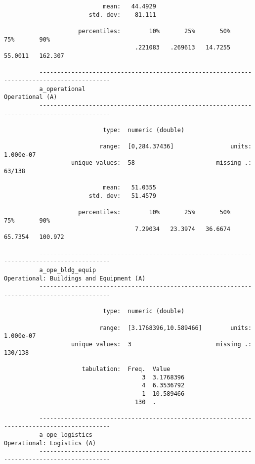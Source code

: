 \documentclass{article}
\begin{document}
\begin{verbatim}
                            mean:   44.4929
                        std. dev:    81.111
          
                     percentiles:        10%       25%       50%       75%       90%
                                     .221083   .269613   14.7255   55.0011   162.307
          
          ------------------------------------------------------------------------------------------
          a_operational                                                              Operational (A)
          ------------------------------------------------------------------------------------------
          
                            type:  numeric (double)
          
                           range:  [0,284.37436]                units:  1.000e-07
                   unique values:  58                       missing .:  63/138
          
                            mean:   51.0355
                        std. dev:   51.4579
          
                     percentiles:        10%       25%       50%       75%       90%
                                     7.29034   23.3974   36.6674   65.7354   100.972
          
          ------------------------------------------------------------------------------------------
          a_ope_bldg_equip                                  Operational: Buildings and Equipment (A)
          ------------------------------------------------------------------------------------------
          
                            type:  numeric (double)
          
                           range:  [3.1768396,10.589466]        units:  1.000e-07
                   unique values:  3                        missing .:  130/138
          
                      tabulation:  Freq.  Value
                                       3  3.1768396
                                       4  6.3536792
                                       1  10.589466
                                     130  .
          
          ------------------------------------------------------------------------------------------
          a_ope_logistics                                                 Operational: Logistics (A)
          ------------------------------------------------------------------------------------------
          

\end{verbatim}
\end{document}

